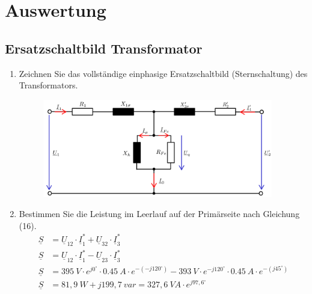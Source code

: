 \section{Auswertung}
\subsection{Ersatzschaltbild Transformator}
\begin{enumerate}[label=\alph*)]
	\item Zeichnen Sie das vollständige einphasige Ersatzschaltbild (Sternschaltung) des
	      Transformators.
	      \begin{figure}[h!]
		      \begin{center}
			      \includegraphics[width=0.95\textwidth]{img/4.1.1.1}
		      \end{center}
		      \caption{}\label{img:4.1.1.1}
	      \end{figure}

	\item Bestimmen Sie die Leistung im Leerlauf auf der Primärseite nach Gleichung (16).
	      \begin{align*}
		      \underline S & = \underline U_{12} \cdot \underline I_1^* + \underline U_{32}\cdot \underline I_3^* \\
		      \underline S & = \underline U_{12} \cdot \underline I_1^* - \underline U_{23}\cdot \underline I_3^* \\
		      \underline S & = 395\ V \cdot e^{j0^\circ} \cdot 0.45\ A \cdot e^{-(-j120^\circ)} -
		      393\ V \cdot e^{-j120^\circ}\cdot 0.45\ A \cdot e^{-(j45^\circ)}                                    \\
		      \underline S & = 81,9\ W + j199,7\ var = 327,6\ VA\cdot e^{j97,6^\circ}
	      \end{align*}


\end{enumerate}
